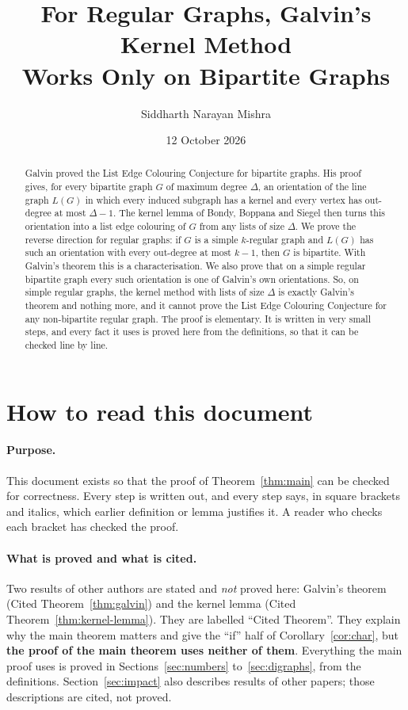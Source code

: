 \documentclass[11pt]{article}
\title{For Regular Graphs, Galvin's Kernel Method\\Works Only on Bipartite Graphs}
\author{Siddharth Narayan Mishra}
\date{12 October 2026}
\theoremstyle{plain}
\theoremstyle{definition}
\theoremstyle{remark}
\newcommand{\LG}{L(G)}
\begin{document}
\maketitle

\begin{abstract}
Galvin proved the List Edge Colouring Conjecture for bipartite graphs. His proof gives, for
every bipartite graph $G$ of maximum degree $\Delta$, an orientation of the line graph $\LG$ in
which every induced subgraph has a kernel and every vertex has out-degree at most $\Delta-1$.
The kernel lemma of Bondy, Boppana and Siegel then turns this orientation into a list edge
colouring of $G$ from any lists of size $\Delta$. We prove the reverse direction for regular
graphs: if $G$ is a simple $k$-regular graph and $\LG$ has such an orientation with every
out-degree at most $k-1$, then $G$ is bipartite. With Galvin's theorem this is a
characterisation. We also prove that on a simple regular bipartite graph every such orientation
is one of Galvin's own orientations. So, on simple regular graphs, the kernel method with lists
of size $\Delta$ is exactly Galvin's theorem and nothing more, and it cannot prove the List
Edge Colouring Conjecture for any non-bipartite regular graph. The proof is elementary. It is
written in very small steps, and every fact it uses is proved here from the definitions, so
that it can be checked line by line.
\end{abstract}

\tableofcontents
\newpage

\section{How to read this document}

\paragraph{Purpose.} This document exists so that the proof of Theorem~\ref{thm:main} can be
checked for correctness. Every step is written out, and every step says, in square brackets
and italics, which earlier definition or lemma justifies it. A reader who checks each bracket
has checked the proof.

\paragraph{What is proved and what is cited.} Two results of other authors are stated and
\emph{not} proved here: Galvin's theorem (Cited Theorem~\ref{thm:galvin}) and the kernel lemma
(Cited Theorem~\ref{thm:kernel-lemma}). They are labelled ``Cited Theorem''. They explain why
the main theorem matters and give the ``if'' half of Corollary~\ref{cor:char}, but \textbf{the
proof of the main theorem uses neither of them}. Everything the main proof uses is proved in
Sections~\ref{sec:numbers} to~\ref{sec:digraphs}, from the definitions. Section~\ref{sec:impact}
also describes results of other papers; those descriptions are cited, not proved.
\end{document}
